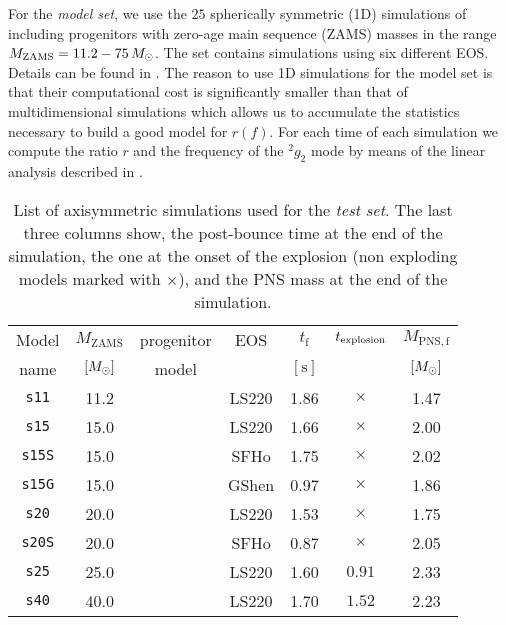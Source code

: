 For the {\it model set}, we use the $25$ spherically symmetric (1D) simulations of \citep{Torres:2019a}
including progenitors with zero-age main sequence (ZAMS) masses in the range 
$M_{\mathrm{ZAMS}} = 11.2 - 75 \, M_{\odot}$. The set contains simulations using  
six different EOS. Details can be found in
 \citep{Torres:2019a}. The reason to use 1D simulations for the model set
 is that their computational cost is significantly smaller than that of multidimensional
 simulations which allows us to accumulate the statistics necessary to build a good model for $r(f)$.
 {For each time of each simulation we compute the ratio $r$ and the frequency of the $^2g_2$ mode by means of the linear analysis
 described in \cite{Torres:2018,Torres:2019a,Torres:2019b}. } 
 
 \begin{table}
 \centering
 \begin{tabular}{c|ccc|ccc}
  \hline
  Model & $M_\mathrm{ZAMS} $ & progenitor& EOS & $t_{\mathrm{f}}$& $t_{\rm explosion}$ & $M_{\mathrm{PNS, f}}$\\
  name& $[M_{\odot}]$ & model & & $[\mathrm{s}]$& & $[M_{\odot}]$ 
  \\ 
  \hline
  \texttt{s11} & 11.2 & \cite{Woosley_Heger_Weaver__2002__ReviewsofModernPhysics__The_evolution_and_explosion_of_massive_stars}& LS220 & 1.86 & $\times$ & 1.47 
  \\ 
  \texttt{s15} & 15.0 & \cite{Woosley_Heger_Weaver__2002__ReviewsofModernPhysics__The_evolution_and_explosion_of_massive_stars}& LS220 & 1.66 & $\times$ & 2.00 
    \\ 
  \texttt{s15S} & 15.0 & \cite{Woosley_Heger_Weaver__2002__ReviewsofModernPhysics__The_evolution_and_explosion_of_massive_stars}& SFHo & 1.75 & $\times$ & 2.02 
    \\ 
  \texttt{s15G} & 15.0 & \cite{Woosley_Heger_Weaver__2002__ReviewsofModernPhysics__The_evolution_and_explosion_of_massive_stars}& GShen & 0.97 & $\times$ & 1.86
     \\ 
  \texttt{s20} & 20.0 & \cite{Woosley_Heger_Weaver__2002__ReviewsofModernPhysics__The_evolution_and_explosion_of_massive_stars}& LS220 & 1.53 & $\times$ & 1.75 
    \\ 
  \texttt{s20S} & 20.0 & \cite{Woosley_Heger__2007__physrep__Nucleosynthesisandremnantsinmassivestarsofsolarmetallicity} & SFHo & 0.87 & $\times$ & 2.05 
  \\ 
  \texttt{s25} & 25.0 & \cite{Woosley_Heger_Weaver__2002__ReviewsofModernPhysics__The_evolution_and_explosion_of_massive_stars}& LS220 & 1.60 & $0.91$ & 2.33 
    \\ 
  \texttt{s40} & 40.0 & \cite{Woosley_Heger_Weaver__2002__ReviewsofModernPhysics__The_evolution_and_explosion_of_massive_stars}& LS220 & 1.70 & $1.52$ & 2.23 
    \\ \hline
 \end{tabular}
 \caption{%
  List of axisymmetric simulations {used for the {\it test set}}. 
  {The last three columns show, the post-bounce time at the end of the
  simulation, the one at the onset of the explosion (non exploding models marked
  with $\times$), and the PNS mass at the end of the simulation.}
 }
 \label{Tab:2dSimList}
\end{table}

